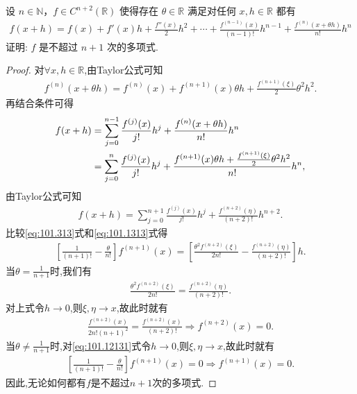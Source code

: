 \documentclass[../../main.tex]{subfiles}%
\begin{document}
\begin{example}
设 \( n \in \mathbb{N} \)，\( f \in C^{n+2}(\mathbb{R}) \) 使得存在 \( \theta \in \mathbb{R} \) 满足对任何 \( x, h \in \mathbb{R} \) 都有
\begin{align*}
f(x + h) = f(x) + f'(x)h + \frac{f''(x)}{2}h^2 + \cdots + \frac{f^{(n-1)}(x)}{(n-1)!}h^{n-1} + \frac{f^{(n)}(x + \theta h)}{n!}h^n
\end{align*}
证明: \( f \) 是不超过 \( n + 1 \) 次的多项式.
\end{example}
\begin{proof}

对$\forall x,h\in \mathbb{R}$,由Taylor公式可知
\begin{align*}
f^{(n)}(x+\theta h) =f^{(n)}(x) +f^{(n+1)}(x) \theta h+\frac{f^{(n+1)}(\xi)}{2}\theta^2 h^2.
\end{align*}
再结合条件可得
\begin{align}
f(x+h) &=\sum_{j=0}^{n-1}\frac{f^{(j)}(x)}{j!}h^j+\frac{f^{(n)}(x+\theta h)}{n!}h^n \notag \\
&=\sum_{j=0}^n\frac{f^{(j)}(x)}{j!}h^j+\frac{f^{(n+1)}(x) \theta h+\frac{f^{(n+1)}(\xi)}{2}\theta^2 h^2}{n!}h^n, \label{eq:101.313}
\end{align}
由Taylor公式可知
\begin{align}
f(x+h) =\sum_{j=0}^{n+1}\frac{f^{(j)}(x)}{j!}h^j+\frac{f^{(n+2)}(\eta)}{(n+2)!}h^{n+2}. \label{eq:101.1313}
\end{align}
比较\eqref{eq:101.313}式和\eqref{eq:101.1313}式得
\begin{align}
\left[ \frac{1}{(n+1)!}-\frac{\theta}{n!} \right] f^{(n+1)}(x) =\left[ \frac{\theta^2 f^{(n+2)}(\xi)}{2n!}-\frac{f^{(n+2)}(\eta)}{(n+2)!} \right] h. \label{eq:101.12131}
\end{align}
当$\theta =\frac{1}{n+1}$时,我们有
\begin{align*}
\frac{\theta^2 f^{(n+2)}(\xi)}{2n!}=\frac{f^{(n+2)}(\eta)}{(n+2)!}.
\end{align*}
对上式令$h\rightarrow 0$,则$\xi,\eta \rightarrow x$,故此时就有
\begin{align*}
\frac{f^{(n+2)}(x)}{2n!(n+1)^2}=\frac{f^{(n+2)}(x)}{(n+2)!}\Rightarrow f^{(n+2)}(x) =0.
\end{align*}
当$\theta \ne \frac{1}{n+1}$时,对\eqref{eq:101.12131}式令$h\rightarrow 0$,则$\xi,\eta \rightarrow x$,故此时就有
\begin{align*}
\left[ \frac{1}{(n+1)!}-\frac{\theta}{n!} \right] f^{(n+1)}(x) =0\Rightarrow f^{(n+1)}(x) =0.
\end{align*}
因此,无论如何都有$f$是不超过$n+1$次的多项式.

\end{proof}
\end{document}
